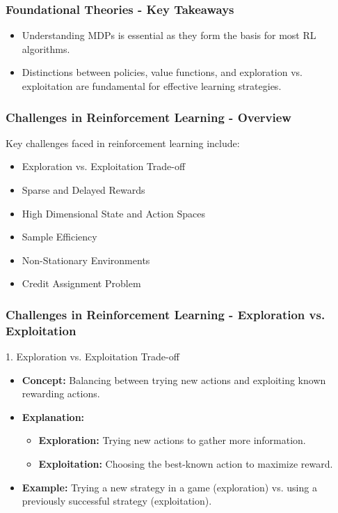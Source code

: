 \documentclass[aspectratio=169]{beamer}
\begin{document}
\begin{frame}[fragile]
    \frametitle{Foundational Theories - Key Takeaways}
    \begin{itemize}
        \item Understanding MDPs is essential as they form the basis for most RL algorithms.
        \item Distinctions between policies, value functions, and exploration vs. exploitation are fundamental for effective learning strategies.
    \end{itemize}
\end{frame}

\begin{frame}[fragile]
    \frametitle{Challenges in Reinforcement Learning - Overview}
    Key challenges faced in reinforcement learning include:
    \begin{itemize}
        \item Exploration vs. Exploitation Trade-off
        \item Sparse and Delayed Rewards
        \item High Dimensional State and Action Spaces
        \item Sample Efficiency
        \item Non-Stationary Environments
        \item Credit Assignment Problem
    \end{itemize}
\end{frame}

\begin{frame}[fragile]
    \frametitle{Challenges in Reinforcement Learning - Exploration vs. Exploitation}
    \begin{block}{1. Exploration vs. Exploitation Trade-off}
        \begin{itemize}
            \item \textbf{Concept:} Balancing between trying new actions and exploiting known rewarding actions.
            \item \textbf{Explanation:}
            \begin{itemize}
                \item \textbf{Exploration:} Trying new actions to gather more information.
                \item \textbf{Exploitation:} Choosing the best-known action to maximize reward.
            \end{itemize}
            \item \textbf{Example:} Trying a new strategy in a game (exploration) vs. using a previously successful strategy (exploitation).
        \end{itemize}
    \end{block}
\end{frame}
\end{document}
